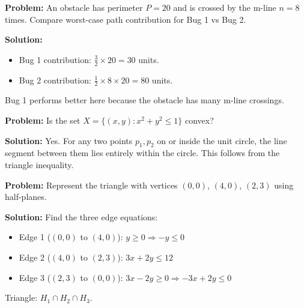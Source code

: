 \begin{exbox}
\textbf{Problem:} An obstacle has perimeter $P = 20$ and is crossed by the m-line $n = 8$ times. Compare worst-case path contribution for Bug 1 vs Bug 2.

\textbf{Solution:}
\begin{itemize}
  \item Bug 1 contribution: $\frac{3}{2} \times 20 = 30$ units.
  \item Bug 2 contribution: $\frac{1}{2} \times 8 \times 20 = 80$ units.
\end{itemize}
Bug 1 performs better here because the obstacle has many m-line crossings.
\end{exbox}

\begin{exbox}
\textbf{Problem:} Is the set $X = \{(x,y) : x^2 + y^2 \leq 1\}$ convex?

\textbf{Solution:} Yes. For any two points $p_1, p_2$ on or inside the unit circle, the line segment between them lies entirely within the circle. This follows from the triangle inequality.
\end{exbox}

\begin{exbox}
\textbf{Problem:} Represent the triangle with vertices $(0,0)$, $(4,0)$, $(2,3)$ using half-planes.

\textbf{Solution:} Find the three edge equations:
\begin{itemize}
  \item Edge 1 ($(0,0)$ to $(4,0)$): $y \geq 0 \Rightarrow -y \leq 0$
  \item Edge 2 ($(4,0)$ to $(2,3)$): $3x + 2y \leq 12$
  \item Edge 3 ($(2,3)$ to $(0,0)$): $3x - 2y \geq 0 \Rightarrow -3x + 2y \leq 0$
\end{itemize}
Triangle: $H_1 \cap H_2 \cap H_3$.
\end{exbox}
